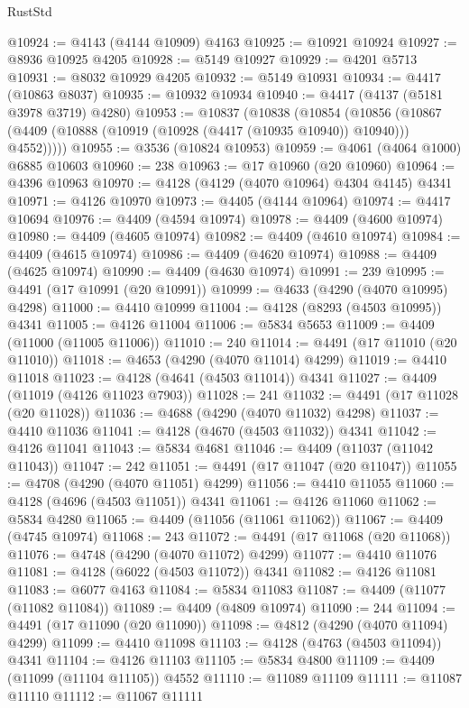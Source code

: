 \begin{lexlean}{RustStd}
\begin{coremodule}
@10924 := @4143 (@4144 @10909) @4163
@10925 := @10921 @10924
@10927 := @8936 @10925 @4205
@10928 := @5149 @10927
@10929 := @4201 @5713
@10931 := @8032 @10929 @4205
@10932 := @5149 @10931
@10934 := @4417 (@10863 @8037)
@10935 := @10932 @10934
@10940 := @4417 (@4137 (@5181 @3978 @3719) @4280)
@10953 := @10837
    (@10838
      (@10854
        (@10856 (@10867 (@4409 (@10888 (@10919 (@10928 (@4417 (@10935 @10940)) @10940))) @4552)))))
@10955 := @3536 (@10824 @10953)
@10959 := @4061 (@4064 @1000) @6885 @10603
@10960 := 238
@10963 := @17 @10960 (@20 @10960)
@10964 := @4396 @10963
@10970 := @4128 (@4129 (@4070 @10964) @4304 @4145) @4341
@10971 := @4126 @10970
@10973 := @4405 (@4144 @10964)
@10974 := @4417 @10694
@10976 := @4409 (@4594 @10974)
@10978 := @4409 (@4600 @10974)
@10980 := @4409 (@4605 @10974)
@10982 := @4409 (@4610 @10974)
@10984 := @4409 (@4615 @10974)
@10986 := @4409 (@4620 @10974)
@10988 := @4409 (@4625 @10974)
@10990 := @4409 (@4630 @10974)
@10991 := 239
@10995 := @4491 (@17 @10991 (@20 @10991))
@10999 := @4633 (@4290 (@4070 @10995) @4298)
@11000 := @4410 @10999
@11004 := @4128 (@8293 (@4503 @10995)) @4341
@11005 := @4126 @11004
@11006 := @5834 @5653
@11009 := @4409 (@11000 (@11005 @11006))
@11010 := 240
@11014 := @4491 (@17 @11010 (@20 @11010))
@11018 := @4653 (@4290 (@4070 @11014) @4299)
@11019 := @4410 @11018
@11023 := @4128 (@4641 (@4503 @11014)) @4341
@11027 := @4409 (@11019 (@4126 @11023 @7903))
@11028 := 241
@11032 := @4491 (@17 @11028 (@20 @11028))
@11036 := @4688 (@4290 (@4070 @11032) @4298)
@11037 := @4410 @11036
@11041 := @4128 (@4670 (@4503 @11032)) @4341
@11042 := @4126 @11041
@11043 := @5834 @4681
@11046 := @4409 (@11037 (@11042 @11043))
@11047 := 242
@11051 := @4491 (@17 @11047 (@20 @11047))
@11055 := @4708 (@4290 (@4070 @11051) @4299)
@11056 := @4410 @11055
@11060 := @4128 (@4696 (@4503 @11051)) @4341
@11061 := @4126 @11060
@11062 := @5834 @4280
@11065 := @4409 (@11056 (@11061 @11062))
@11067 := @4409 (@4745 @10974)
@11068 := 243
@11072 := @4491 (@17 @11068 (@20 @11068))
@11076 := @4748 (@4290 (@4070 @11072) @4299)
@11077 := @4410 @11076
@11081 := @4128 (@6022 (@4503 @11072)) @4341
@11082 := @4126 @11081
@11083 := @6077 @4163
@11084 := @5834 @11083
@11087 := @4409 (@11077 (@11082 @11084))
@11089 := @4409 (@4809 @10974)
@11090 := 244
@11094 := @4491 (@17 @11090 (@20 @11090))
@11098 := @4812 (@4290 (@4070 @11094) @4299)
@11099 := @4410 @11098
@11103 := @4128 (@4763 (@4503 @11094)) @4341
@11104 := @4126 @11103
@11105 := @5834 @4800
@11109 := @4409 (@11099 (@11104 @11105)) @4552
@11110 := @11089 @11109
@11111 := @11087 @11110
@11112 := @11067 @11111

\end{coremodule}
\end{lexlean}
